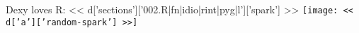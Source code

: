 \noindent Dexy loves R:
\tiny
<< d['sections']['002.R|fn|idio|rint|pyg|l']['spark'] >>
\texttt{[image: << d['a']['random-spark'] >>]}

